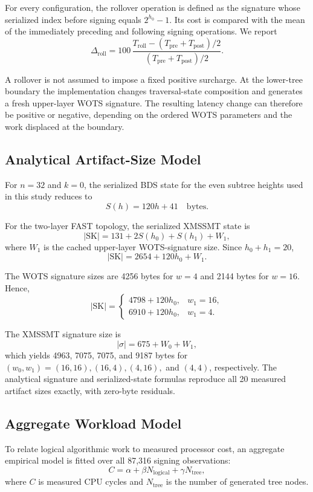 \documentclass[pdflatex,sn-mathphys-num]{sn-jnl}
\begin{document}
For every configuration, the rollover operation is defined as the
signature whose serialized index before signing equals
$2^{h_0}-1$. Its cost is compared with the mean of the immediately
preceding and following signing operations. We report
\[
\Delta_{\mathrm{roll}}
=
100\,
\frac{T_{\mathrm{roll}}-
      (T_{\mathrm{pre}}+T_{\mathrm{post}})/2}
     {(T_{\mathrm{pre}}+T_{\mathrm{post}})/2}.
\]

A rollover is not assumed to impose a fixed positive surcharge.
At the lower-tree boundary the implementation changes traversal-state
composition and generates a fresh upper-layer WOTS signature. The
resulting latency change can therefore be positive or negative,
depending on the ordered WOTS parameters and the work displaced at the
boundary.

\subsection{Analytical Artifact-Size Model}
\label{sec:size_model}

For $n=32$ and $k=0$, the serialized BDS state for the even subtree
heights used in this study reduces to
\[
S(h)=120h+41 \quad \text{bytes}.
\]

For the two-layer FAST topology, the serialized XMSSMT state is
\[
|\mathrm{SK}|
 =
131+2S(h_0)+S(h_1)+W_1,
\]
where $W_1$ is the cached upper-layer WOTS-signature size. Since
$h_0+h_1=20$,
\[
|\mathrm{SK}|=2654+120h_0+W_1.
\]

The WOTS signature sizes are 4256 bytes for $w=4$ and 2144 bytes for
$w=16$. Hence,
\[
|\mathrm{SK}|=
\begin{cases}
4798+120h_0, & w_1=16,\\
6910+120h_0, & w_1=4.
\end{cases}
\]

The XMSSMT signature size is
\[
|\sigma|
=
675+W_0+W_1,
\]
which yields 4963, 7075, 7075, and 9187 bytes for
$(w_0,w_1)=(16,16),(16,4),(4,16),$ and $(4,4)$, respectively.
The analytical signature and serialized-state formulas reproduce all
20 measured artifact sizes exactly, with zero-byte residuals.

\subsection{Aggregate Workload Model}
\label{sec:aggregate_model}

To relate logical algorithmic work to measured processor cost, an
aggregate empirical model is fitted over all 87,316 signing
observations:
\[
C =
\alpha
+\beta N_{\mathrm{logical}}
+\gamma N_{\mathrm{tree}},
\]
where $C$ is measured CPU cycles and $N_{\mathrm{tree}}$ is the number
of generated tree nodes.
\end{document}
